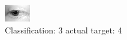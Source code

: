 \begin{figure}[h!]
\begin{center}
\includegraphics[width=0.60\columnwidth]{figures/ID2574_class_3_target_4.png}
\end{center}
\caption{ Classification: 3 actual target: 4}
\label{fig:ID2574_class_3_target_4}
\end{figure}

